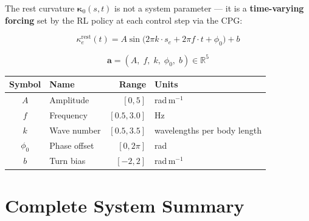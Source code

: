 \documentclass[11pt]{article}
\newcommand{\vect}[1]{\mathbf{#1}}
\newcommand{\Real}{\mathbb{R}}
\begin{document}
The rest curvature $\bm{\kappa}_0(s, t)$ is not a system parameter --- it is a \textbf{time-varying forcing} set by the RL policy at each control step via the CPG:

\begin{equation}
  \kappa_e^{\text{rest}}(t)
    = A \sin\!\bigl(2\pi k \cdot s_e + 2\pi f \cdot t + \phi_0\bigr) + b
  \label{eq:cpg}
\end{equation}

\begin{equation}
  \vect{a} = (A,\; f,\; k,\; \phi_0,\; b) \in \Real^5
  \label{eq:action}
\end{equation}

\begin{table}[H]
  \centering
  \begin{tabular}{clrl}
    \toprule
    Symbol & Name & Range & Units \\
    \midrule
    $A$ & Amplitude & $[0, 5]$ & rad\,m$^{-1}$ \\
    $f$ & Frequency & $[0.5, 3.0]$ & Hz \\
    $k$ & Wave number & $[0.5, 3.5]$ & wavelengths per body length \\
    $\phi_0$ & Phase offset & $[0, 2\pi]$ & rad \\
    $b$ & Turn bias & $[-2, 2]$ & rad\,m$^{-1}$ \\
    \bottomrule
  \end{tabular}
\end{table}

\section{Complete System Summary}
\label{sec:summary}
\end{document}
